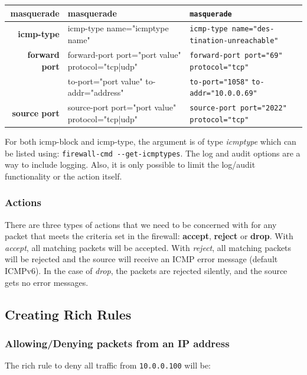 \noindent
\begin{tabular}{rM{0.48}M{0.3}}
	\midrule
	\textbf{masquerade}	&masquerade &\verb|masquerade|\\
	\midrule
	\textbf{icmp-type}	&icmp-type name="icmptype name" &\verb|icmp-type name="des-| \verb|tination-unreachable"|\\
	\midrule
	\textbf{forward port}	&forward-port port="port value" protocol="tcp|udp" &\verb|forward-port port="69"| \verb|protocol="tcp"|\\
	&to-port="port value" to-addr="address" &\verb|to-port="1058"| \verb|to-addr="10.0.0.69"|\\
	\midrule
	\textbf{source port}	&source-port port="port value" protocol="tcp|udp" &\verb|source-port port="2022"| \verb|protocol="tcp"|\\
	\bottomrule
\end{tabular}

\noindent
For both icmp-block and icmp-type, the argument is of type \textit{icmptype} which can be listed using: \verb|firewall-cmd --get-icmptypes|. The log and audit options are a way to include logging. Also, it is only possible to limit the log/audit functionality or the action itself. 

\subsubsection{Actions}
\vspace{-10pt}
There are three types of actions that we need to be concerned with for any packet that meets the criteria set in the firewall: \textbf{accept}, \textbf{reject} or \textbf{drop}. With \textit{accept}, all matching packets will be accepted. With \textit{reject}, all matching packets will be rejected and the source will receive an ICMP error message (default ICMPv6). In the case of \textit{drop}, the packets are rejected silently, and the source gets no error messages. 

\subsection{Creating Rich Rules}
\subsubsection{Allowing/Denying packets from an IP address}
\vspace{-10pt}
The rich rule to deny all traffic from \verb|10.0.0.100| will be:

